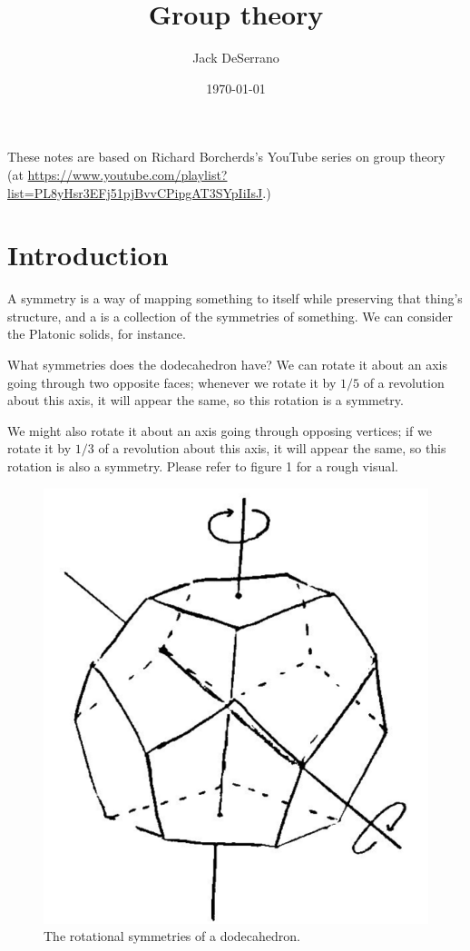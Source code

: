 \documentclass[11pt, oneside]{amsart}
\title{Group theory}
\author{Jack DeSerrano}
\date{\today}
\begin{document}
\maketitle
These notes are based on Richard Borcherds's YouTube series on group theory (at \url{https://www.youtube.com/playlist?list=PL8yHsr3EFj51pjBvvCPipgAT3SYpIiIsJ}.)

\tableofcontents
\newpage

\section{Introduction}
A symmetry is a way of mapping something to itself while preserving that thing's structure, and a  is a collection of the symmetries of something. We can consider the Platonic solids, for instance. 

What symmetries does the dodecahedron have? We can rotate it about an axis going through two opposite faces; whenever we rotate it by $1/5$ of a revolution about this axis, it will appear the same, so this rotation is a symmetry. 

We might also rotate it about an axis going through opposing vertices; if we rotate it by $1/3$ of a revolution about this axis, it will appear the same, so this rotation is also a symmetry. Please refer to figure 1 for a rough visual.
\begin{figure}
\centering
\includegraphics[scale=0.4]{images/dodecahedron}
\caption{The rotational symmetries of a dodecahedron.}
\end{figure}
\end{document}
